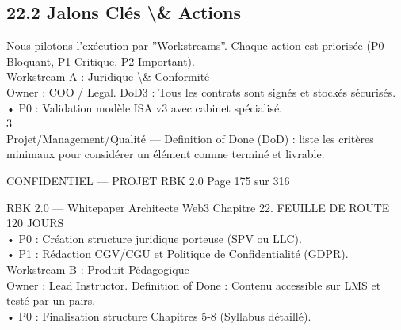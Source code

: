 \subsection{22.2 Jalons Clés \textbackslash{}& Actions}
Nous pilotons l’exécution par ”Workstreams”. Chaque action est priorisée (P0 Bloquant, P1 Critique, P2 Important).\\
\vspace{0.5em}
Workstream A : Juridique \textbackslash{}& Conformité\\
\vspace{0.5em}
Owner : COO / Legal. DoD3 : Tous les contrats sont signés et stockés sécurisés.\\
\vspace{0.5em}
• P0 : Validation modèle ISA v3 avec cabinet spécialisé.\\
3\\
Projet/Management/Qualité — Definition of Done (DoD) : liste les critères minimaux pour considérer un élément comme terminé et livrable.\\
\vspace{0.5em}
\vspace{0.5em}
\vspace{0.5em}
\vspace{0.5em}
\begin{confidential}CONFIDENTIEL — PROJET RBK 2.0                                                   Page 175 sur 316\end{confidential}
RBK 2.0 — Whitepaper Architecte Web3                                                                            Chapitre 22. FEUILLE DE ROUTE 120 JOURS\\
\vspace{0.5em}
\vspace{0.5em}
• P0 : Création structure juridique porteuse (SPV ou LLC).\\
\vspace{0.5em}
• P1 : Rédaction CGV/CGU et Politique de Confidentialité (GDPR).\\
\vspace{0.5em}
Workstream B : Produit Pédagogique\\
\vspace{0.5em}
Owner : Lead Instructor. Definition of Done : Contenu accessible sur LMS et testé par un pairs.\\
\vspace{0.5em}
• P0 : Finalisation structure Chapitres 5-8 (Syllabus détaillé).\\
\vspace{0.5em}
